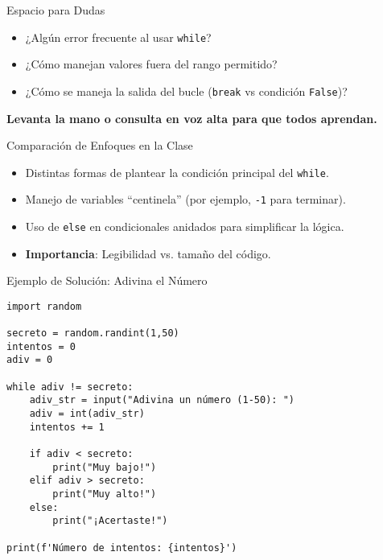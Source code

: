 \documentclass[10pt]{beamer}
\begin{document}
\begin{frame}{Espacio para Dudas}
  \begin{itemize}
    \item ¿Algún error frecuente al usar \texttt{while}?
    \item ¿Cómo manejan valores fuera del rango permitido?
    \item ¿Cómo se maneja la salida del bucle (\texttt{break} vs condición \texttt{False})?
  \end{itemize}
  \vspace{0.3cm}
  \textbf{Levanta la mano o consulta en voz alta para que todos aprendan.}
\end{frame}

\begin{frame}{Comparación de Enfoques en la Clase}
  \begin{itemize}
    \item Distintas formas de plantear la condición principal del \texttt{while}.
    \item Manejo de variables “centinela” (por ejemplo, \texttt{-1} para terminar).
    \item Uso de \texttt{else} en condicionales anidados para simplificar la lógica.
    \item \textbf{Importancia}: Legibilidad vs. tamaño del código.
  \end{itemize}
\end{frame}

\begin{frame}[fragile]{Ejemplo de Solución: Adivina el Número}
\begin{verbatim}
import random

secreto = random.randint(1,50)
intentos = 0
adiv = 0

while adiv != secreto:
    adiv_str = input("Adivina un número (1-50): ")
    adiv = int(adiv_str)
    intentos += 1

    if adiv < secreto:
        print("Muy bajo!")
    elif adiv > secreto:
        print("Muy alto!")
    else:
        print("¡Acertaste!")

print(f'Número de intentos: {intentos}')
\end{verbatim}
\end{frame}
\end{document}
